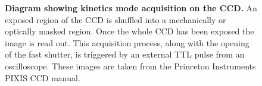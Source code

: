 \documentclass[12pt, a4paper, twoside]{book}
\begin{document}
\begin{figure}[bt]
\caption[Diagram showing kinetics mode acquisition on the CCD]{\textbf{Diagram showing kinetics mode acquisition on the CCD.} An exposed region of the CCD is shuffled into a mechanically or optically masked region. Once the whole CCD has been exposed the image is read out. This acquisition process, along with the opening of the fast shutter, is triggered by an external TTL pulse from an oscilloscope. These images are taken from the Princeton Instruments PIXIS CCD manual.}
\label{fig:kinetics_diagram}
\end{figure}
\end{document}
